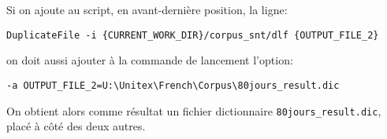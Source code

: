 \bigskip
\noindent Si on ajoute au script, en avant-dernière position, la ligne:

\begin{Verbatim}[fontsize=\small,fontfamily=helvetica]
DuplicateFile -i {CURRENT_WORK_DIR}/corpus_snt/dlf {OUTPUT_FILE_2}
\end{Verbatim}

\noindent on doit aussi ajouter à la commande de lancement l'option:

\begin{Verbatim}[fontsize=\small,fontfamily=helvetica]
-a OUTPUT_FILE_2=U:\Unitex\French\Corpus\80jours_result.dic
\end{Verbatim}

\noindent On obtient alors comme résultat un fichier dictionnaire \verb$80jours_result.dic$, placé à côté
des deux autres.
